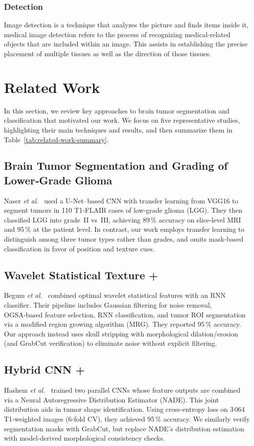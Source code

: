 \subsubsection{Detection}
Image detection is a technique that analyzes the picture and finds
items inside it, medical image detection refers to the process of recognizing
medical-related objects that are included within an image. This assists in
establishing the precise placement of multiple tissues as well as the direction
of those tissues.

\section{Related Work}
\label{sec:related-work}


In this section, we review key approaches to brain tumor segmentation and classification that motivated our work. We focus on five representative studies, highlighting their main techniques and results, and then summarize them in Table~\ref{tab:related-work-summary}.

\subsection{Brain Tumor Segmentation and Grading of Lower‑Grade Glioma}
Naser \emph{et al.}~\cite{naser2020glioma} used a U‑Net–based CNN with transfer learning from VGG16 to segment tumors in 110 T1‑FLAIR cases of low‑grade glioma (LGG). They then classified LGG into grade II vs III, achieving 89\,\% accuracy on slice‑level MRI and 95\,\% at the patient level. In contrast, our work employs transfer learning to distinguish among three tumor types rather than grades, and omits mask‑based classification in favor of position and texture cues.

\subsection{Wavelet Statistical Texture +  }
Begum \emph{et al.}~\cite{begum2020wavelet} combined optimal wavelet statistical features with an RNN classifier. Their pipeline includes Gaussian filtering for noise removal, OGSA‑based feature selection, RNN classification, and tumor ROI segmentation via a modified region growing algorithm (MRG). They reported 95\,\% accuracy. Our approach instead uses skull stripping with morphological dilation/erosion (and GrabCut verification) to eliminate noise without explicit filtering.

\subsection{Hybrid CNN + }
Hashem \emph{et al.}~\cite{hashem2020nade} trained two parallel CNNs whose feature outputs are combined via a Neural Autoregressive Distribution Estimator (NADE). This joint distribution aids in tumor shape identification. Using cross‑entropy loss on 3\,064 T1‑weighted images (6‑fold CV), they achieved 95\,\% accuracy. We similarly verify segmentation masks with GrabCut, but replace NADE’s distribution estimation with model‑derived morphological consistency checks.

